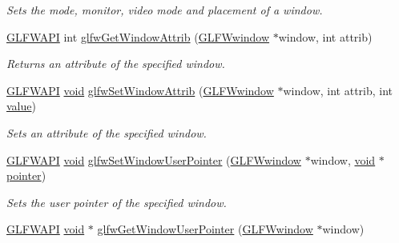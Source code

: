 \begin{DoxyCompactItemize}
\begin{DoxyCompactList}\small\item\em Sets the mode, monitor, video mode and placement of a window. \end{DoxyCompactList}\item 
\mbox{\hyperlink{glfw3_8h_a56da5036b2cc259351ae22fd6439bb47}{G\+L\+F\+W\+A\+PI}} int \mbox{\hyperlink{group__window_ga1bb0c7e100418e284dbb800789c63d40}{glfw\+Get\+Window\+Attrib}} (\mbox{\hyperlink{group__window_ga3c96d80d363e67d13a41b5d1821f3242}{G\+L\+F\+Wwindow}} $\ast$window, int attrib)
\begin{DoxyCompactList}\small\item\em Returns an attribute of the specified window. \end{DoxyCompactList}\item 
\mbox{\hyperlink{glfw3_8h_a56da5036b2cc259351ae22fd6439bb47}{G\+L\+F\+W\+A\+PI}} \mbox{\hyperlink{glad_8h_a950fc91edb4504f62f1c577bf4727c29}{void}} \mbox{\hyperlink{group__window_gad39f43f07856efcf3d656426a9284c75}{glfw\+Set\+Window\+Attrib}} (\mbox{\hyperlink{group__window_ga3c96d80d363e67d13a41b5d1821f3242}{G\+L\+F\+Wwindow}} $\ast$window, int attrib, int \mbox{\hyperlink{glad_8h_a03aff08f73d7fde3d1a08e0abd8e84fa}{value}})
\begin{DoxyCompactList}\small\item\em Sets an attribute of the specified window. \end{DoxyCompactList}\item 
\mbox{\hyperlink{glfw3_8h_a56da5036b2cc259351ae22fd6439bb47}{G\+L\+F\+W\+A\+PI}} \mbox{\hyperlink{glad_8h_a950fc91edb4504f62f1c577bf4727c29}{void}} \mbox{\hyperlink{group__window_gacc9e68faee3c1763b54cd9bc405cf43e}{glfw\+Set\+Window\+User\+Pointer}} (\mbox{\hyperlink{group__window_ga3c96d80d363e67d13a41b5d1821f3242}{G\+L\+F\+Wwindow}} $\ast$window, \mbox{\hyperlink{glad_8h_a950fc91edb4504f62f1c577bf4727c29}{void}} $\ast$\mbox{\hyperlink{glad_8h_a233635a5878bad16cd0b314d8773733c}{pointer}})
\begin{DoxyCompactList}\small\item\em Sets the user pointer of the specified window. \end{DoxyCompactList}\item 
\mbox{\hyperlink{glfw3_8h_a56da5036b2cc259351ae22fd6439bb47}{G\+L\+F\+W\+A\+PI}} \mbox{\hyperlink{glad_8h_a950fc91edb4504f62f1c577bf4727c29}{void}} $\ast$ \mbox{\hyperlink{group__window_ga0a9ff3b4bf8589e9518e8816d06a8f50}{glfw\+Get\+Window\+User\+Pointer}} (\mbox{\hyperlink{group__window_ga3c96d80d363e67d13a41b5d1821f3242}{G\+L\+F\+Wwindow}} $\ast$window)

\end{DoxyCompactItemize}
